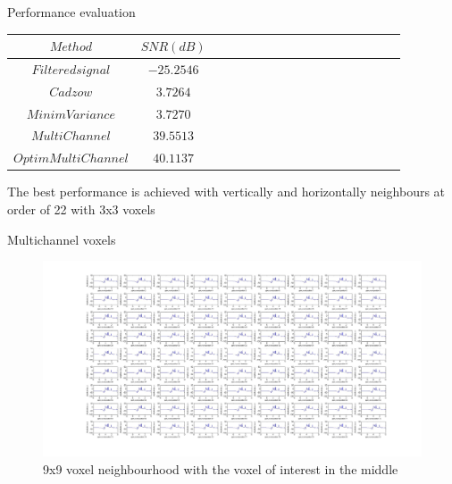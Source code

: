 \documentclass[t,12pt,english
\ifx\beamermode\undefined\else,\beamermode\fi
]{beamer}
\begin{document}
\begin{frame}{Performance evaluation}

\begin{table}[!htbp]
\centering
\label{table:55}
\begin{tabular}{c c c c c c c c c c c c c c c c c}
$Method$&$SNR(dB)$\\
  \hline  
$Filtered signal$&$-25.2546$\\
$Cadzow$&$3.7264$\\
$MinimVariance$&$3.7270$\\
$MultiChannel$&$39.5513$\\
$OptimMultiChannel$&$40.1137$\\
  \hline  
\end{tabular}
\end{table}  

{The best performance is achieved with vertically and horizontally neighbours at order of 22 with 3x3 voxels} 
     
\end{frame}

\begin{frame}{Multichannel voxels}
    
\begin{figure}[!htbp]
\centering
\includegraphics[width=1\textwidth]{37.jpg}
\caption{\tiny 9x9 voxel neighbourhood with the voxel of interest in the middle}\label{figtoda1}
\end{figure}

\end{frame}
\end{document}

